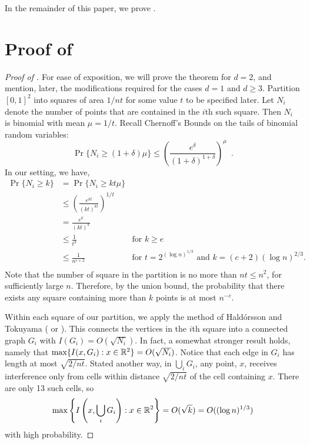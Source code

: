 \documentclass{patmorin}
\begin{document}
In the remainder of this paper, we prove .

\section{Proof of }

\begin{proof}[Proof of ]
For ease of exposition, we will prove the theorem for $d=2$, and mention,
later, the modifications required for the cases $d=1$ and $d\ge 3$.
Partition $[0,1]^2$ into squares of area $1/nt$ for some value $t$
to be specified later.  Let $N_i$ denote the number of points that
are contained in the $i$th such square.  Then $N_i$ is binomial with
mean $\mu=1/t$.  Recall Chernoff's Bounds \cite{c52} on the tails of
binomial random variables:
\[
  \Pr\{N_i \ge (1+\delta)\mu\} 
    \le \left(\frac{e^\delta}{(1+\delta)^{1+\delta}}\right)^\mu \enspace .
\]
In our setting, we have, 
\begin{align*}
  \Pr\{N_i \ge k\} 
    & = \Pr\{N_i \ge kt\mu\} \\
    & \le \left(\frac{e^{kt}}{(kt)^{kt}}\right)^{1/t} \\
    & = \frac{e^{k}}{(kt)^{k}} \\
    & \le \frac{1}{t^{k}} & \text{for $k\ge e$} \\
    & \le \frac{1}{n^{c+2}} & \text{for $t=2^{(\log n)^{1/3}}$ and $k=(c+2)(\log n)^{2/3}$.} \\
\end{align*}
Note that the number of square in the partition is no more than $nt\le
n^2$, for sufficiently large $n$.  Therefore, by the union bound, the
probability that there exists any square containing more than $k$ points
is at most $n^{-c}$.

Within each square of our partition, we apply the method of Hald\'orsson
and Tokuyama \cite{htXX} ( or ).  This
connects the vertices in the $i$th square into a connected graph $G_i$
with $I(G_i)=O(\sqrt{N_i})$.  In fact, a somewhat stronger result holds,
namely that $\max\{I(x,G_i) : x\in\mathbb{R}^2\}=O(\sqrt{N_i})$.  Notice that
each edge in $G_i$ has length at most $\sqrt{2/nt}$.  Stated another
way, in $\bigcup_i G_i$, any point, $x$, receives interference only
from cells within distance $\sqrt{2/nt}$ of the cell containing $x$.
There are only 13 such cells, so
\[
  \max\left\{I\left(x,\bigcup_iG_i\right) : x\in\mathbb{R}^2\right\}=O(\sqrt{k}) 
    = O((\log n)^{1/3})
\]
with high probability.


\end{proof}
\end{document}
